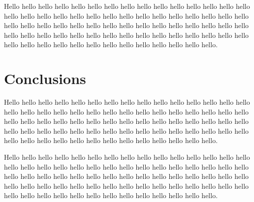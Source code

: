 \documentclass[12pt]{article} %
\begin{document}
Hello hello hello hello hello hello hello hello hello hello hello hello hello hello hello hello hello hello hello hello hello hello hello hello hello hello hello hello hello hello hello hello hello hello hello hello hello hello hello hello hello hello hello hello hello hello hello hello hello hello hello hello hello hello hello hello hello hello hello hello hello hello hello hello hello hello hello hello hello hello hello hello hello.

\section*{Conclusions}
Hello hello hello hello hello hello hello hello hello hello hello hello hello hello hello hello hello hello hello hello hello hello hello hello hello hello hello hello hello hello hello hello hello hello hello hello hello hello hello hello hello hello hello hello hello hello hello hello hello hello hello hello hello hello hello hello hello hello hello hello hello hello hello hello hello hello hello hello hello hello hello hello hello.

Hello hello hello hello hello hello hello hello hello hello hello hello hello hello hello hello hello hello hello hello hello hello hello hello hello hello hello hello hello hello hello hello hello hello hello hello hello hello hello hello hello hello hello hello hello hello hello hello hello hello hello hello hello hello hello hello hello hello hello hello hello hello hello hello hello hello hello hello hello hello hello hello hello.

\end{document}

